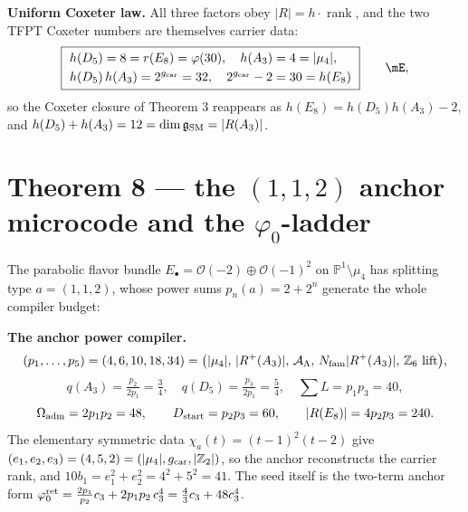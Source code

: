 \noindent\textbf{Uniform Coxeter law.} All three factors obey $|R|=h\cdot\operatorname{rank}$, and the
two TFPT Coxeter numbers are themselves carrier data:
\begin{equation}
  \boxed{\ \begin{aligned}
    &h(D_5)=8=r(E_8)=\varphi(30),\quad h(A_3)=4=|\mu_4|,\\
    &h(D_5)\,h(A_3)=2^{\gcar}=32,\quad 2^{\gcar}-2=30=h(E_8)
  \end{aligned}\ }\qquad\mE ,
\end{equation}
so the Coxeter closure of Theorem 3 reappears as $h(E_8)=h(D_5)h(A_3)-2$, and
$h(D_5)+h(A_3)=12=\dim\mathfrak g_{\mathrm{SM}}=|R(A_3)|$.

\section*{Theorem 8 --- the $(1,1,2)$ anchor microcode and the $\varphi_0$-ladder}
\providecommand{\phiz}{\varphi_0^{\mathrm{ret}}}
The parabolic flavor bundle $E_\bullet=\mathcal O(-2)\oplus\mathcal O(-1)^2$ on $\mathbb P^1\setminus\mu_4$
has splitting type $a=(1,1,2)$, whose power sums $p_n(a)=2+2^n$ generate the whole compiler budget:

\par\medskip\noindent\textbf{The anchor power compiler.}
\[
  (p_1,\dots,p_5)=(4,6,10,18,34)=\bigl(|\mu_4|,\,|R^+(A_3)|,\,\mathcal A_\Lambda,\,N_{\mathrm{fam}}|R^+(A_3)|,\,\text{$\mathbb Z_6$ lift}\bigr),
\]
\[
  q(A_3)=\tfrac{p_2}{2p_1}=\tfrac34,\quad q(D_5)=\tfrac{p_3}{2p_1}=\tfrac54,\quad \textstyle\sum L=p_1p_3=40,
\]
\[
  \Omega_{\mathrm{adm}}=2p_1p_2=48,\qquad D_{\mathrm{start}}=p_2p_3=60,\qquad |R(E_8)|=4p_2p_3=240.
\]
The elementary symmetric data $\chi_a(t)=(t-1)^2(t-2)$ give $(e_1,e_2,e_3)=(4,5,2)=(|\mu_4|,g_{\mathrm{car}},|\mathbb Z_2|)$,
so the anchor reconstructs the carrier rank, and $10b_1=e_1^2+e_2^2=4^2+5^2=41$. The seed itself is the
two-term anchor form $\phiz=\tfrac{2p_1}{p_2}\cthree+2p_1p_2\,\cthree^4=\tfrac43\cthree+48\cthree^4$.

